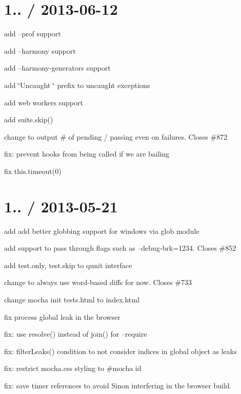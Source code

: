 \section*{1.. / 2013-\/06-\/12}


\begin{DoxyItemize}
\item add --prof support
\item add --harmony support
\item add --harmony-\/generators support
\item add \char`\"{}\+Uncaught \char`\"{} prefix to uncaught exceptions
\item add web workers support
\item add {\ttfamily suite.\+skip()}
\item change to output \# of pending / passing even on failures. Closes \#872
\item fix\+: prevent hooks from being called if we are bailing
\item fix {\ttfamily this.\+timeout(0)}
\end{DoxyItemize}

\section*{1.. / 2013-\/05-\/21}


\begin{DoxyItemize}
\item add add better globbing support for windows via {\ttfamily glob} module
\item add support to pass through flags such as --debug-\/brk=1234. Closes \#852
\item add test.\+only, test.\+skip to qunit interface
\item change to always use word-\/based diffs for now. Closes \#733
\item change {\ttfamily mocha init} tests.\+html to index.\+html
\item fix {\ttfamily process} global leak in the browser
\item fix\+: use resolve() instead of join() for --require
\item fix\+: filter\+Leaks() condition to not consider indices in global object as leaks
\item fix\+: restrict mocha.\+css styling to \#mocha id
\item fix\+: save timer references to avoid Sinon interfering in the browser build.
\end{DoxyItemize}

